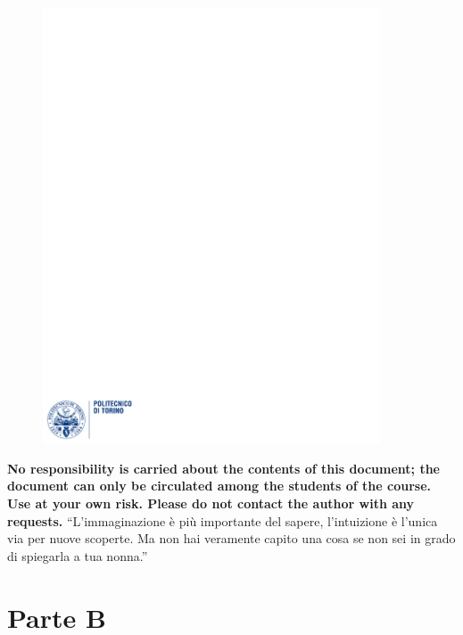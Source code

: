 \documentclass[12pt]{article}
\begin{document}
\begin{figure}
  \centering
  \includegraphics[width=10cm]{images/polito.pdf}
\end{figure}

\maketitle
\bigskip
\bigskip
\noindent \textbf{No responsibility is carried about the contents of this document; the document can only be circulated among the students of the course. Use at your own risk. Please do not contact the author with any requests.}
\newpage
\tableofcontents
\bigskip
\bigskip
``L'immaginazione è più importante del sapere, l'intuizione è l'unica via per nuove scoperte. Ma non hai veramente capito una cosa se non sei in grado di spiegarla a tua nonna.''\\
\newpage

\section{Parte B}
\end{document}
